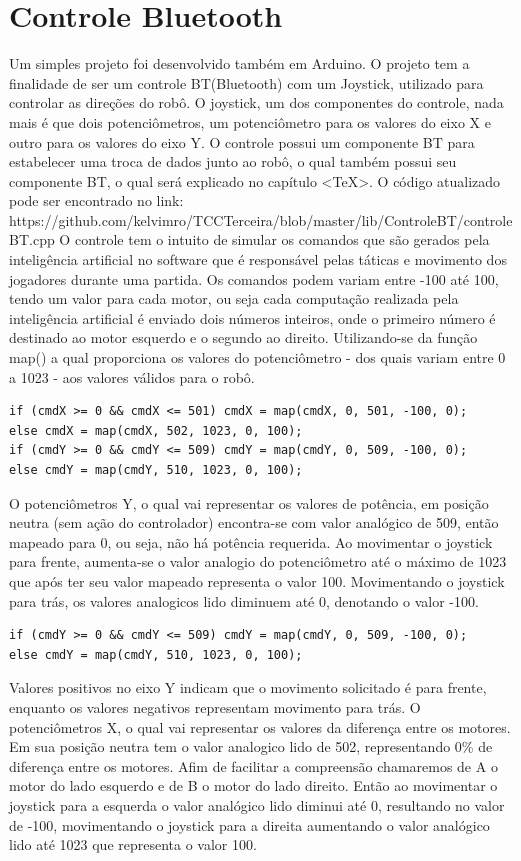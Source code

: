 \documentclass[a4paper,12pt,portuguese]{ufms-cpcx}
\begin{document}
\chapter{Controle Bluetooth}
Um simples projeto foi desenvolvido também em Arduino. O projeto tem a finalidade de ser um controle BT(Bluetooth) com um Joystick, utilizado para controlar as direções do robô. 
O joystick, um dos componentes do controle, nada mais é que dois potenciômetros, um potenciômetro para os valores do eixo X e outro para os valores do eixo Y. 
O controle possui um componente BT para estabelecer uma troca de dados junto ao robô, o qual também possui seu componente BT, o qual será explicado no capítulo <TeX>.
O código atualizado pode ser encontrado no link: https://github.com/kelvimro/TCCTerceira/blob/master/lib/ControleBT/controleBT.cpp 
O controle tem o intuito de simular os comandos que são gerados pela inteligência artificial no software que é responsável pelas táticas e movimento dos jogadores durante uma partida.
Os comandos podem variam entre -100 até 100, tendo um valor para cada motor, ou seja cada computação realizada pela inteligência artificial é enviado dois números inteiros, onde o primeiro número é destinado ao motor esquerdo e o segundo ao direito.
Utilizando-se da função map() a qual proporciona os valores do potenciômetro - dos quais variam entre 0 a 1023 - aos valores válidos para o robô.
\begin{lstlisting}
if (cmdX >= 0 && cmdX <= 501) cmdX = map(cmdX, 0, 501, -100, 0);
else cmdX = map(cmdX, 502, 1023, 0, 100);
if (cmdY >= 0 && cmdY <= 509) cmdY = map(cmdY, 0, 509, -100, 0);
else cmdY = map(cmdY, 510, 1023, 0, 100);
\end{lstlisting}
O potenciômetros Y, o qual vai representar os valores de potência, em posição neutra (sem ação do controlador) encontra-se com valor analógico de 509, então mapeado para 0, ou seja, não há potência requerida.
Ao movimentar o joystick para frente, aumenta-se o valor analogio do potenciômetro até o máximo de 1023 que após ter seu valor mapeado representa o valor 100.
Movimentando o joystick para trás, os valores analogicos lido diminuem até 0, denotando o valor -100. 
\begin{lstlisting}
if (cmdY >= 0 && cmdY <= 509) cmdY = map(cmdY, 0, 509, -100, 0);
else cmdY = map(cmdY, 510, 1023, 0, 100);
\end{lstlisting}
Valores positivos no eixo Y indicam que o movimento solicitado é para frente, enquanto os valores negativos representam movimento para trás.
O potenciômetros X, o qual vai representar os valores da diferença entre os motores. Em sua posição neutra tem o valor analogico lido de 502, representando 0\% de diferença entre os motores. Afim de facilitar a compreensão chamaremos de A o motor do lado esquerdo e de B o motor do lado direito. Então ao movimentar o joystick para a esquerda o valor analógico lido diminui até 0, resultando no valor de -100, movimentando o joystick para a direita aumentando o valor analógico lido até 1023 que representa o valor 100. 
\end{document}
